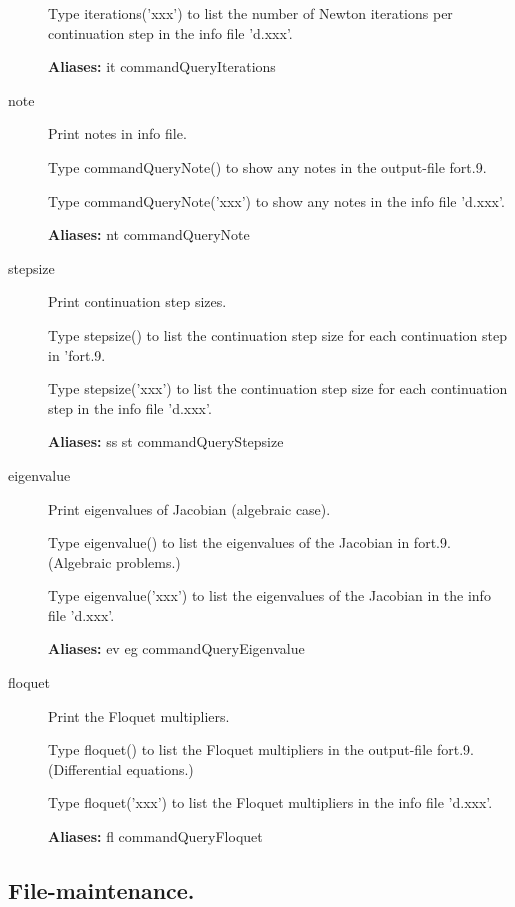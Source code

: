 \documentclass[12pt]{report}
\begin{document}
\begin{description}
    Type iterations('xxx') to list the number of Newton iterations per
    continuation step in the info file 'd.xxx'.
    
\textbf{Aliases:} it commandQueryIterations

\item[note]
Print notes in info file.

    Type commandQueryNote() to show any notes 
    in the output-file fort.9.

    Type commandQueryNote('xxx') to show any notes 
    in the info file 'd.xxx'.
    
\textbf{Aliases:} nt commandQueryNote

\item[stepsize]
Print continuation step sizes.

    Type stepsize() to list the continuation step size for each
    continuation step in  'fort.9. 

    Type stepsize('xxx') to list the continuation step size for each
    continuation step in the info file 'd.xxx'.
    
\textbf{Aliases:} ss st commandQueryStepsize

\item[eigenvalue]
Print eigenvalues of Jacobian (algebraic case).

    Type eigenvalue() to list the eigenvalues of the Jacobian 
    in fort.9. 
    (Algebraic problems.)

    Type eigenvalue('xxx') to list the eigenvalues of the Jacobian 
    in the info file 'd.xxx'.
    
\textbf{Aliases:} ev eg commandQueryEigenvalue

\item[floquet]
Print the Floquet multipliers.

    Type floquet() to list the Floquet multipliers
    in the output-file fort.9. 
    (Differential equations.)

    Type floquet('xxx') to list the Floquet multipliers 
    in the info file 'd.xxx'.
    
\textbf{Aliases:} fl commandQueryFloquet
\end{description}

\subsection{File-maintenance.}
\end{document}
